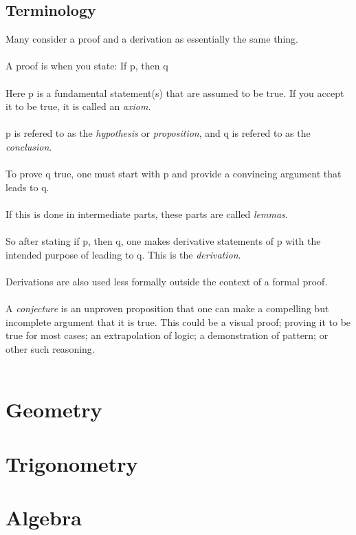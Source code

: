 \documentclass[11pt]{book}
\begin{document}
\section*{Terminology}
Many consider a proof and a derivation as essentially the same thing.\\
\\
A proof is when you state: If p, then q\\
\\
Here p is a fundamental statement(s) that are assumed to be true.  If you accept it to be true, it is called an \emph{axiom}.\\
\\
p is refered to as the \emph{hypothesis} or \emph{proposition}, and q is refered to as the \emph{conclusion}.\\
\\
To prove q true, one must start with p and provide a convincing argument that leads to q.\\
\\
If this is done in intermediate parts, these parts are called \emph{lemmas}.\\
\\
So after stating if p, then q, one makes derivative statements of p with the intended purpose of leading to q.  This is the \emph{derivation}.\\
\\
Derivations are also used less formally outside the context of a formal proof.\\
\\
A \emph{conjecture} is an unproven proposition that one can make a compelling but incomplete argument that it is true.  This could be a visual proof; proving it to be true for most cases; an extrapolation of logic; a demonstration of pattern; or other such reasoning.\\
\\

 
\chapter{Geometry}



\chapter{Trigonometry}



\chapter{Algebra}
\end{document}
